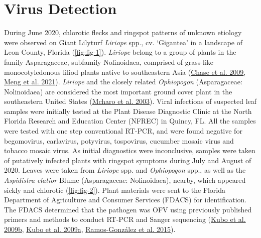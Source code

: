 \documentclass[12pt,final,CPage]{ufthesis}
\begin{document}
{  \hypertarget{virus-detection}{%
  \section{Virus Detection}\label{virus-detection}}

  During June 2020, chlorotic flecks and ringspot patterns of unknown etiology were observed on Giant Lilyturf \emph{Liriope} spp., cv. `Gigantea' in a landscape of Leon County, Florida (\ref{fig:fig-1}). \emph{Liriope} belong to a group of plants in the family Asparagaceae, subfamily Nolinoidaea, comprised of grass-like monocotyledonous liliod plants native to southeastern Asia (\protect\hyperlink{ref-Chase2009}{Chase et al. 2009}, \protect\hyperlink{ref-Meng2021}{Meng et al. 2021}). \emph{Liriope} and the closely related \emph{Ophiopogon} (Asparagaceae: Nolinoidaea) are considered the most important ground cover plant in the southeastern United States (\protect\hyperlink{ref-Mcharo2003}{Mcharo et al. 2003}). Viral infections of suspected leaf samples were initially tested at the Plant Disease Diagnostic Clinic at the North Florida Research and Education Center (NFREC) in Quincy, FL. All the samples were tested with one step conventional RT-PCR, and were found negative for begomovirus, carlavirus, potyvirus, tospovirus, cucumber mosaic virus and tobacco mosaic virus. As initial diagnostics were inconclusive, samples were taken of putatively infected plants with ringspot symptoms during July and August of 2020. Leaves were taken from \emph{Liriope} spp. and \emph{Ophiopogon} spp., as well as the \emph{Aspidistra elatior} Blume (Asparagaceae: Nolinoidaea), nearby, which appeared sickly and chlorotic (\ref{fig:fig-2}). Plant materials were sent to the Florida Department of Agriculture and Consumer Services (FDACS) for identification. The FDACS determined that the pathogen was OFV using previously published primers and methods to conduct RT-PCR and Sanger sequencing (\protect\hyperlink{ref-Kubo2009}{Kubo et al. 2009b}, \protect\hyperlink{ref-Kubo2009a}{Kubo et al. 2009a}, \protect\hyperlink{ref-RamosGonzalez2015}{Ramos-González et al. 2015}).
}
\end{document}

